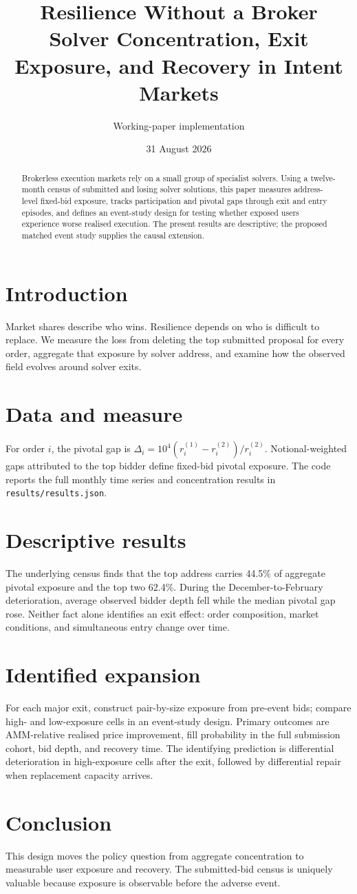 \documentclass[11pt]{article}
\title{Resilience Without a Broker\\\large Solver Concentration, Exit Exposure, and Recovery in Intent Markets}
\author{Working-paper implementation}\date{31 August 2026}
\begin{document}
\maketitle
\begin{abstract} Brokerless execution markets rely on a small group of specialist solvers.  Using a twelve-month census of submitted and losing solver solutions, this paper measures address-level fixed-bid exposure, tracks participation and pivotal gaps through exit and entry episodes, and defines an event-study design for testing whether exposed users experience worse realised execution.  The present results are descriptive; the proposed matched event study supplies the causal extension.\end{abstract}
\section{Introduction} Market shares describe who wins.  Resilience depends on who is difficult to replace.  We measure the loss from deleting the top submitted proposal for every order, aggregate that exposure by solver address, and examine how the observed field evolves around solver exits.
\section{Data and measure} For order $i$, the pivotal gap is $\Delta_i=10^4(r_i^{(1)}-r_i^{(2)})/r_i^{(2)}$.  Notional-weighted gaps attributed to the top bidder define fixed-bid pivotal exposure.  The code reports the full monthly time series and concentration results in \texttt{results/results.json}.
\section{Descriptive results} The underlying census finds that the top address carries 44.5\% of aggregate pivotal exposure and the top two 62.4\%.  During the December-to-February deterioration, average observed bidder depth fell while the median pivotal gap rose.  Neither fact alone identifies an exit effect: order composition, market conditions, and simultaneous entry change over time.
\section{Identified expansion} For each major exit, construct pair-by-size exposure from pre-event bids; compare high- and low-exposure cells in an event-study design.  Primary outcomes are AMM-relative realised price improvement, fill probability in the full submission cohort, bid depth, and recovery time.  The identifying prediction is differential deterioration in high-exposure cells after the exit, followed by differential repair when replacement capacity arrives.
\section{Conclusion} This design moves the policy question from aggregate concentration to measurable user exposure and recovery.  The submitted-bid census is uniquely valuable because exposure is observable before the adverse event.
\end{document}
